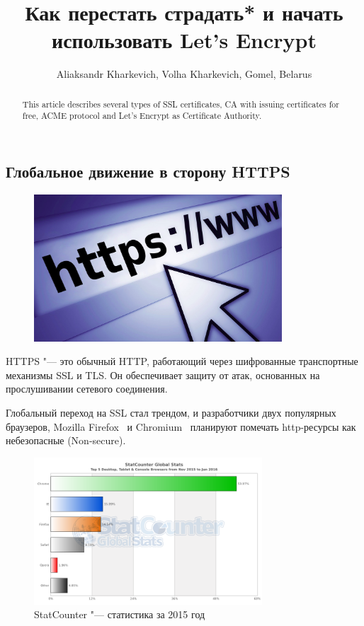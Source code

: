 \documentclass[10pt, a5paper]{article}
\begin{document}
\title{Как перестать страдать* и начать использовать Let's Encrypt}
\author{Aliaksandr Kharkevich, Volha Kharkevich, Gomel, Belarus}
\maketitle

\begin{abstract}
This article describes several types of SSL certificates, CA with issuing certificates for free, ACME protocol and Let's Encrypt as Certificate Authority.
\end{abstract}

\subsection*{Глобальное движение в сторону HTTPS}

\begin{figure}[h!]
  \centering
  \includegraphics[height=5.5cm]{w_03_2016_Kharkevich1.png}
  
\end{figure}

HTTPS "--- это обычный HTTP, работающий через шифрованные транспортные механизмы SSL и TLS. Он обеспечивает защиту от атак, основанных на прослушивании сетевого соединения.

Глобальный переход на SSL стал трендом, и разработчики двух популярных браузеров, Mozilla Firefox~\cite{Kharkevich1} и Chromium~\cite{Kharkevich2} планируют помечать http-ресурсы как небезопасные (Non-secure).

\begin{figure}[h!]
  \centering
  \includegraphics[height=5.5cm]{w_03_2016_Kharkevich2.png}
\caption*{StatCounter "--- статистика за 2015 год}
\end{figure}
\end{document}

